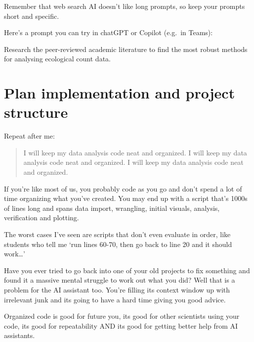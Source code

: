\documentclass[
  letterpaper,
  DIV=11,
  numbers=noendperiod]{scrreprt}
\begin{document}
Remember that web search AI doesn't like long prompts, so keep your
prompts short and specific.

Here's a prompt you can try in chatGPT or Copilot (e.g.~in Teams):

\begin{tcolorbox}[enhanced jigsaw, coltitle=black, breakable, toptitle=1mm, titlerule=0mm, bottomtitle=1mm, colframe=quarto-callout-note-color-frame, left=2mm, leftrule=.75mm, title=\textcolor{quarto-callout-note-color}{\faInfo}\hspace{0.5em}{Note}, opacityback=0, colback=white, opacitybacktitle=0.6, bottomrule=.15mm, arc=.35mm, rightrule=.15mm, toprule=.15mm, colbacktitle=quarto-callout-note-color!10!white]

Research the peer-reviewed academic literature to find the most robust
methods for analysing ecological count data.

\end{tcolorbox}

\section{Plan implementation and project
structure}\label{plan-implementation-and-project-structure}

Repeat after me:

\begin{quote}
I will keep my data analysis code neat and organized. I will keep my
data analysis code neat and organized. I will keep my data analysis code
neat and organized.
\end{quote}

If you're like most of us, you probably code as you go and don't spend a
lot of time organizing what you've created. You may end up with a script
that's 1000s of lines long and spans data import, wrangling, initial
visuals, analysis, verification and plotting.

The worst cases I've seen are scripts that don't even evaluate in order,
like students who tell me `run lines 60-70, then go back to line 20 and
it should work\ldots{}'

Have you ever tried to go back into one of your old projects to fix
something and found it a massive mental struggle to work out what you
did? Well that is a problem for the AI assistant too. You're filling its
context window up with irrelevant junk and its going to have a hard time
giving you good advice.

Organized code is good for future you, its good for other scientists
using your code, its good for repeatability AND its good for getting
better help from AI assistants.
\end{document}
